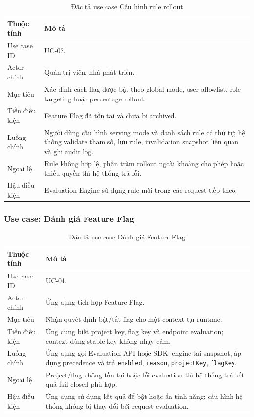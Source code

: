 \begin{table}[H]
    \centering
    \caption{Đặc tả use case Cấu hình rule rollout}
    \label{tab:uc-configure-rollout-rule}
    \begin{tabular}{p{} p{}}
        \toprule
        \textbf{Thuộc tính} & \textbf{Mô tả} \\
        \midrule
        Use case ID & UC-03. \\
        Actor chính & Quản trị viên, nhà phát triển. \\
        Mục tiêu & Xác định cách flag được bật theo global mode, user allowlist, role targeting hoặc percentage rollout. \\
        Tiền điều kiện & Feature Flag đã tồn tại và chưa bị archived. \\
        Luồng chính & Người dùng cấu hình serving mode và danh sách rule có thứ tự; hệ thống validate tham số, lưu rule, invalidation snapshot liên quan và ghi audit log. \\
        Ngoại lệ & Rule không hợp lệ, phần trăm rollout ngoài khoảng cho phép hoặc thiếu quyền thì hệ thống trả lỗi. \\
        Hậu điều kiện & Evaluation Engine sử dụng rule mới trong các request tiếp theo. \\
        \bottomrule
    \end{tabular}
\end{table}

\subsubsection{Use case: Đánh giá Feature Flag}

\begin{table}[H]
    \centering
    \caption{Đặc tả use case Đánh giá Feature Flag}
    \label{tab:uc-evaluate-flag}
    \begin{tabular}{p{} p{}}
        \toprule
        \textbf{Thuộc tính} & \textbf{Mô tả} \\
        \midrule
        Use case ID & UC-04. \\
        Actor chính & Ứng dụng tích hợp Feature Flag. \\
        Mục tiêu & Nhận quyết định bật/tắt flag cho một context tại runtime. \\
        Tiền điều kiện & Ứng dụng biết project key, flag key và endpoint evaluation; context dùng stable key không nhạy cảm. \\
        Luồng chính & Ứng dụng gọi Evaluation API hoặc SDK; engine tải snapshot, áp dụng precedence và trả \texttt{enabled}, \texttt{reason}, \texttt{projectKey}, \texttt{flagKey}. \\
        Ngoại lệ & Project/flag không tồn tại hoặc lỗi evaluation thì hệ thống trả kết quả fail-closed phù hợp. \\
        Hậu điều kiện & Ứng dụng sử dụng kết quả để bật hoặc ẩn tính năng; cấu hình hệ thống không bị thay đổi bởi request evaluation. \\
        \bottomrule
    \end{tabular}
\end{table}

